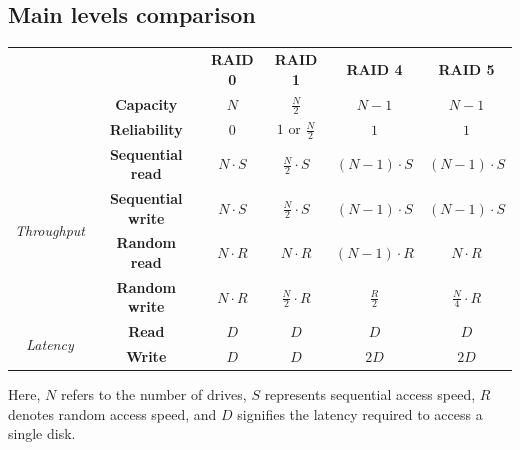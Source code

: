 \subsection{Main levels comparison}
\begin{table}[H]
    \centering
    \begin{tabular}{cc|c|c|c|c|}
    \cline{3-6}
    \textit{\textbf{}}                                        &                           & \textbf{RAID 0} & \textbf{RAID 1}             & \textbf{RAID 4} & \textbf{RAID 5}      \\ \cline{2-6} 
    \multicolumn{1}{c|}{\textit{}}                            & \textbf{Capacity}         & $N$             & $\frac{N}{2}$               & $N-1$           & $N-1$                \\
    \multicolumn{1}{c|}{\textit{}}                            & \textbf{Reliability}      & $0$             & $1 \text{ or } \frac{N}{2}$ & $1$             & $1$                  \\ \cline{2-6} 
    \multicolumn{1}{c|}{\multirow{4}{*}{\textit{Throughput}}} & \textbf{Sequential read}  & $N\cdot S$      & $\frac{N}{2}\cdot S$        & $(N-1)\cdot S$  & $(N-1)\cdot S$       \\
    \multicolumn{1}{c|}{}                                     & \textbf{Sequential write} & $N\cdot S$      & $\frac{N}{2}\cdot S$        & $(N-1)\cdot S$  & $(N-1)\cdot S$       \\
    \multicolumn{1}{c|}{}                                     & \textbf{Random read}      & $N\cdot R$      & $N \cdot R$                 & $(N-1)\cdot R$  & $N\cdot R$           \\
    \multicolumn{1}{c|}{}                                     & \textbf{Random write}     & $N\cdot R$      & $\frac{N}{2}\cdot R$        & $\frac{R}{2}$   & $\frac{N}{4}\cdot R$ \\ \cline{2-6} 
    \multicolumn{1}{c|}{\multirow{2}{*}{\textit{Latency}}}    & \textbf{Read}             & $D$             & $D$                         & $D$             & $D$                  \\
    \multicolumn{1}{c|}{}                                     & \textbf{Write}            & $D$             & $D$                         & $2D$            & $2D$                 \\ \cline{2-6} 
    \end{tabular}
    \end{table}
Here, $N$ refers to the number of drives, $S$ represents sequential access speed, $R$ denotes random access speed, and $D$ signifies the latency required to access a single disk.




